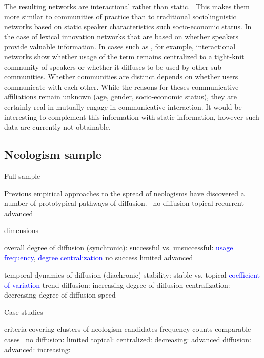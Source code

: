 \documentclass[a4paper, abstract=on]{scrartcl}
\newcommand{\mtrc}[1]{\textcolor{blue}{#1}}
\begin{document}
    The resulting networks are interactional rather than static.~\parencite{Goel2016} This makes them more similar to communities of practice than to traditional sociolinguistic networks based on static speaker characteristics such socio-economic status.
      In the case of lexical innovation networks that are based on whether speakers provide valuable information. In cases such as , for example, interactional networks show whether usage of the term remains centralized to a tight-knit community of speakers or whether it diffuses to be used by other sub-communities.
        Whether communities are distinct depends on whether users communicate with each other. While the reasons for theses communicative affiliations remain unknown (age, gender, socio-economic status), they are certainly real in mutually engage in communicative interaction.
          It would be interesting to complement this information with static information, however such data are currently not obtainable.

  \subsection{Neologism sample}

    Full sample

      Previous empirical approaches to the spread of neologisms have discovered a number of prototypical pathways of diffusion.~\parencite{Kerremans2015}
        no diffusion
        topical
        recurrent
        advanced

      dimensions

        overall degree of diffusion (synchronic): successful vs. unsuccessful: \mtrc{usage frequency}, \mtrc{degree centralization}
          no success
          limited
          advanced

        temporal dynamics of diffusion (diachronic)
          stability: stable vs. topical \mtrc{coefficient of variation}
          trend
            diffusion: increasing degree of diffusion
            centralization: decreasing degree of diffusion
          speed

    Case studies

      criteria
        covering clusters of neologism candidates
        frequency counts comparable
      cases~\parencite{Kerremans2015}
        no diffusion: 
        limited
          topical: 
          centralized: 
          decreasing: 
        advanced diffusion:
          advanced: 
          increasing: 
\end{document}
